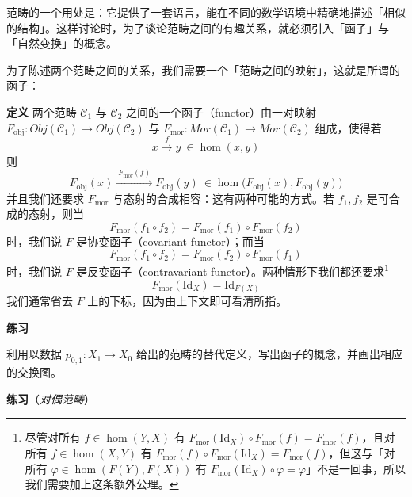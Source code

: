 范畴的一个用处是：它提供了一套语言，能在不同的数学语境中精确地描述「相似的结构」。这样讨论时，为了谈论范畴之间的有趣关系，就必须引入「函子」与「自然变换」的概念。

为了陈述两个范畴之间的关系，我们需要一个「范畴之间的映射」，这就是所谓的函子：

\textbf{定义} 两个范畴 $\mathcal{C}_1$ 与 $\mathcal{C}_2$ 之间的一个函子（functor）由一对映射 $F_{\mathrm{obj}}:\mathit{Obj}(\mathcal{C}_1)\to\mathit{Obj}(\mathcal{C}_2)$ 与 $F_{\mathrm{mor}}:\mathit{Mor}(\mathcal{C}_1)\to\mathit{Mor}(\mathcal{C}_2)$ 组成，使得若
\begin{equation}
x\xrightarrow{\ f\ }y\ \in\hom(x,y)
\tag{K.7}
\label{eq:K.7}
\end{equation}
则
\begin{equation}
F_{\mathrm{obj}}(x)\xrightarrow{\ F_{\mathrm{mor}}(f)\ }F_{\mathrm{obj}}(y)\ \in\hom\big(F_{\mathrm{obj}}(x),F_{\mathrm{obj}}(y)\big)
\tag{K.8}
\label{eq:K.8}
\end{equation}
并且我们还要求 $F_{\mathrm{mor}}$ 与态射的合成相容：这有两种可能的方式。若 $f_1,f_2$ 是可合成的态射，则当
\begin{equation}
F_{\mathrm{mor}}(f_1\circ f_2)=F_{\mathrm{mor}}(f_1)\circ F_{\mathrm{mor}}(f_2)
\tag{K.9}
\label{eq:K.9}
\end{equation}
时，我们说 $F$ 是协变函子（covariant functor）；而当
\begin{equation}
F_{\mathrm{mor}}(f_1\circ f_2)=F_{\mathrm{mor}}(f_2)\circ F_{\mathrm{mor}}(f_1)
\tag{K.10}
\label{eq:K.10}
\end{equation}
时，我们说 $F$ 是反变函子（contravariant functor）。两种情形下我们都还要求\footnote{尽管对所有 $f\in\hom(Y,X)$ 有 $F_{\mathrm{mor}}(\mathrm{Id}_X)\circ F_{\mathrm{mor}}(f)=F_{\mathrm{mor}}(f)$，且对所有 $f\in\hom(X,Y)$ 有 $F_{\mathrm{mor}}(f)\circ F_{\mathrm{mor}}(\mathrm{Id}_X)=F_{\mathrm{mor}}(f)$，但这与「对所有 $\varphi\in\hom(F(Y),F(X))$ 有 $F_{\mathrm{mor}}(\mathrm{Id}_X)\circ\varphi=\varphi$」不是一回事，所以我们需要加上这条额外公理。}
\begin{equation}
F_{\mathrm{mor}}(\mathrm{Id}_X)=\mathrm{Id}_{F(X)}
\tag{K.11}
\label{eq:K.11}
\end{equation}
我们通常省去 $F$ 上的下标，因为由上下文即可看清所指。

\medskip
\textbf{练习}

利用以数据 $p_{0,1}:X_1\to X_0$ 给出的范畴的替代定义，写出函子的概念，并画出相应的交换图。

\medskip
\textbf{练习}（\textit{对偶范畴}）

